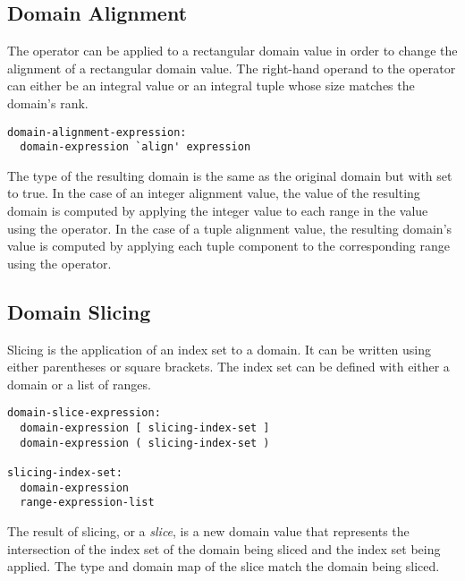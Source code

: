 \subsection{Domain Alignment}
\label{Domain_Alignment}

The  operator can be applied to a rectangular domain value in
order to change the alignment of a rectangular domain value.  The right-hand
operand to the  operator can either be an integral value or
an integral tuple whose size matches the domain's rank.

\begin{syntax}
\begin{verbatim}
domain-alignment-expression:
  domain-expression `align' expression
\end{verbatim}
\end{syntax}

The type of the resulting domain is the same as the original domain
but with  set to true.
In the case of an integer alignment value, the value of the resulting
domain is computed by applying the integer value to each range in the
value using the  operator.  In the case of a tuple
alignment value, the resulting domain's value is computed by applying
each tuple component to the corresponding range using the 
operator.


\subsection{Domain Slicing}
\label{Domain_Slicing}

Slicing is the application of an index set to a domain.
It can be written using either parentheses or square brackets.
The index set can be defined with either a domain or a list of ranges.

\begin{syntax}
\begin{verbatim}
domain-slice-expression:
  domain-expression [ slicing-index-set ]
  domain-expression ( slicing-index-set )

slicing-index-set:
  domain-expression
  range-expression-list
\end{verbatim}
\end{syntax}

The result of slicing, or a \emph{slice}, is a new domain value
that represents the intersection of
the index set of the domain being sliced and
the index set being applied.
The type and domain map of the slice match the domain being sliced.

